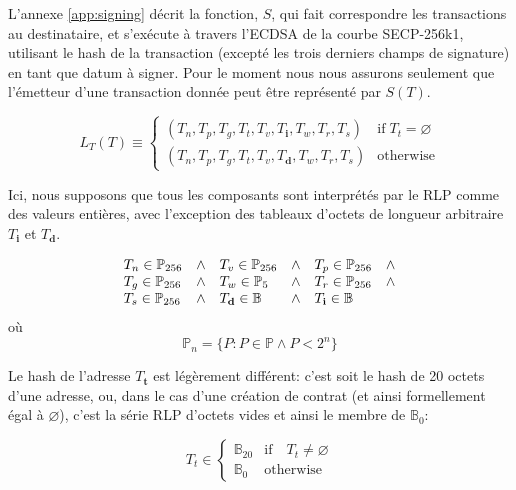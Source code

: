 \documentclass[9pt,oneside]{amsart}
\begin{document}
\begin{multicols}{2}
L'annexe \ref{app:signing} décrit la fonction, $S$, qui fait correspondre les transactions au destinataire, et s'exécute à travers l'ECDSA de la courbe SECP-256k1, utilisant le hash de la transaction (excepté les trois derniers champs de signature) en tant que datum à signer. Pour le moment nous nous assurons seulement que l'émetteur d'une transaction donnée peut être représenté par $S(T)$.

\begin{equation}
L_T(T) \equiv \begin{cases}
(T_n, T_p, T_g, T_t, T_v, T_\mathbf{i}, T_w, T_r, T_s) & \text{if} \; T_t = \varnothing\\
(T_n, T_p, T_g, T_t, T_v, T_\mathbf{d}, T_w, T_r, T_s) & \text{otherwise}
\end{cases}
\end{equation}

Ici, nous supposons que tous les composants sont interprétés par le RLP comme des valeurs entières, avec l'exception des tableaux d'octets de longueur arbitraire $T_\mathbf{i}$ et $T_\mathbf{d}$.

\begin{equation}
\begin{array}[t]{lclclc}
T_n \in \mathbb{P}_{256} & \wedge & T_v \in \mathbb{P}_{256} & \wedge & T_p \in \mathbb{P}_{256} & \wedge \\
T_g \in \mathbb{P}_{256} & \wedge & T_w \in \mathbb{P}_5 & \wedge & T_r \in \mathbb{P}_{256} & \wedge \\
T_s \in \mathbb{P}_{256} & \wedge & T_\mathbf{d} \in \mathbb{B} & \wedge & T_\mathbf{i} \in \mathbb{B}
\end{array}
\end{equation}
où
\begin{equation}
\mathbb{P}_n = \{ P: P \in \mathbb{P} \wedge P < 2^n \}
\end{equation}

Le hash de l'adresse $T_\mathbf{t}$ est légèrement différent: c'est soit le hash de 20 octets d'une adresse, ou, dans le cas d'une création de contrat (et ainsi formellement égal à $\varnothing$), c'est la série RLP d'octets vides et ainsi le membre de $\mathbb{B}_0$:

\begin{equation}
T_t \in \begin{cases} \mathbb{B}_{20} & \text{if} \quad T_t \neq \varnothing \\
\mathbb{B}_{0} & \text{otherwise}\end{cases}
\end{equation}


\end{multicols}
\end{document}
